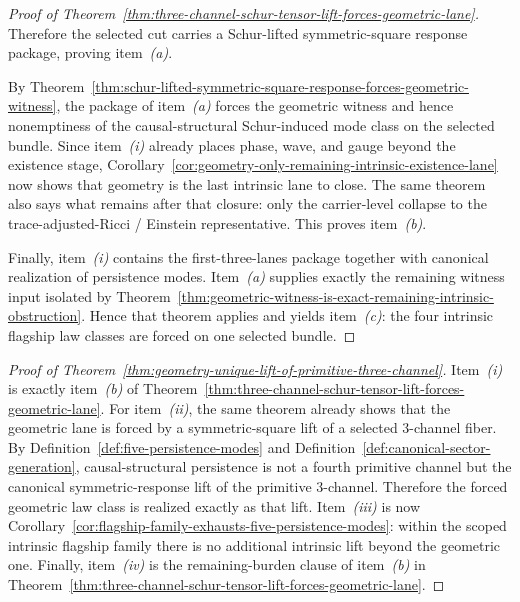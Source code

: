 \begin{proof}[Proof of Theorem~\ref{thm:three-channel-schur-tensor-lift-forces-geometric-lane}]
Therefore the selected cut carries a Schur-lifted symmetric-square response
package, proving item~\emph{(a)}.

By
Theorem~\ref{thm:schur-lifted-symmetric-square-response-forces-geometric-witness},
the package of item~\emph{(a)} forces the geometric witness and hence
nonemptiness of the causal-structural Schur-induced mode class on the selected
bundle. Since item~\emph{(i)} already places phase, wave, and gauge beyond the
existence stage,
Corollary~\ref{cor:geometry-only-remaining-intrinsic-existence-lane} now shows
that geometry is the last intrinsic lane to close. The same theorem also says
what remains after that closure: only the carrier-level collapse to the
trace-adjusted-Ricci / Einstein representative. This proves item~\emph{(b)}.

Finally, item~\emph{(i)} contains the first-three-lanes package together with
canonical realization of persistence modes. Item~\emph{(a)} supplies exactly
the remaining witness input isolated by
Theorem~\ref{thm:geometric-witness-is-exact-remaining-intrinsic-obstruction}.
Hence that theorem applies and yields item~\emph{(c)}: the four intrinsic
flagship law classes are forced on one selected bundle.
\end{proof}

\begin{proof}[Proof of Theorem~\ref{thm:geometry-unique-lift-of-primitive-three-channel}]
\label{proof:thm:geometry-unique-lift-of-primitive-three-channel}
Item~\emph{(i)} is exactly item~\emph{(b)} of
Theorem~\ref{thm:three-channel-schur-tensor-lift-forces-geometric-lane}. For
item~\emph{(ii)}, the same theorem already shows that the geometric lane is
forced by a symmetric-square lift of a selected \(3\)-channel fiber. By
Definition~\ref{def:five-persistence-modes} and
Definition~\ref{def:canonical-sector-generation}, causal-structural
persistence is not a fourth primitive channel but the canonical
symmetric-response lift of the primitive \(3\)-channel. Therefore the forced
geometric law class is realized exactly as that lift. Item~\emph{(iii)} is now
Corollary~\ref{cor:flagship-family-exhausts-five-persistence-modes}: within the
scoped intrinsic flagship family there is no additional intrinsic lift beyond
the geometric one. Finally, item~\emph{(iv)} is the remaining-burden clause of
item~\emph{(b)} in
Theorem~\ref{thm:three-channel-schur-tensor-lift-forces-geometric-lane}.
\end{proof}


